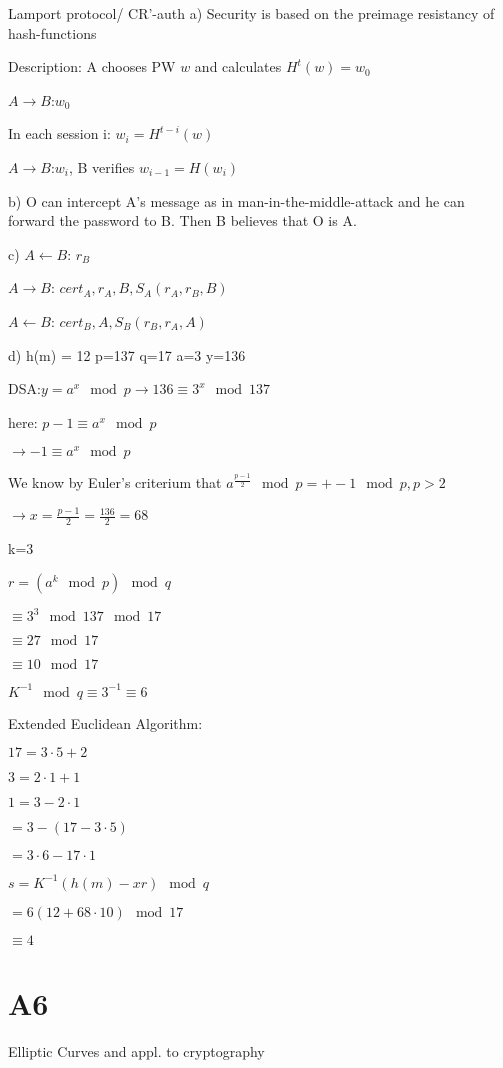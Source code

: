 \documentclass[a4paper]{article}
\begin{document}
Lamport protocol/ CR'-auth
a) Security is based on the preimage resistancy of hash-functions

Description: A chooses PW $w$ and calculates $H^t(w) =w_0$

$A\rightarrow B$:$w_0$

In each session i: $w_i = H^{t-i}(w)$

$A\rightarrow B$:$w_i$, B verifies $w_{i-1}=H(w_i)$

b) O can intercept A's message as in man-in-the-middle-attack and he can forward the password to B.
Then B believes that O is A.

c) $A\leftarrow B$: $r_B$

$A\rightarrow B$: $cert_A,r_A, B, S_A(r_A,r_B,B)$

$A \leftarrow B$: $cert_B,A,S_B(r_B,r_A,A)$

d) h(m) = 12 p=137 q=17 a=3 y=136

DSA:$y=a^x\mod p \rightarrow 136 \equiv 3^x \mod 137$

here: $p-1 \equiv a^x \mod p$

$\rightarrow -1 \equiv a^x \mod p$

We know by Euler's criterium that $a^{\frac{p-1}{2}}\mod p = +- 1 \mod p,p>2$

$\rightarrow x=\frac{p-1}{2}=\frac{136}{2} = 68$

k=3

$r= (a^k \mod p ) \mod q$

$\equiv 3^3 \mod 137 \mod 17$

$\equiv 27 \mod 17$

$\equiv 10 \mod 17$

$K^{-1} \mod q \equiv 3^{-1} \equiv 6 $

Extended Euclidean Algorithm:

$17=3\cdot 5 +2$

$3=2\cdot 1 +1$

$1=3-2\cdot 1$

$=3-(17-3\cdot 5)$

$=3\cdot 6 - 17\cdot 1$

$s=K^{-1}(h(m)-xr)\mod q$

$=6(12+68\cdot 10) \mod 17$

$\equiv 4$

\section{A6} 
Elliptic Curves and appl. to cryptography
\end{document}
